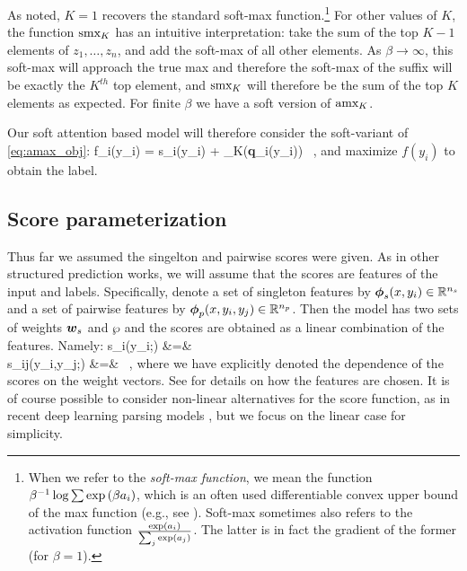 As noted, $K=1$ recovers the standard soft-max function.\footnote{When we refer to the {\em soft-max function}, we mean the function $\beta^{-1}\log\sum \exp\left({\beta a_i}\right)$, which is an often used differentiable convex upper bound of the max function (e.g., see \cite{gimpel2010softmax}). Soft-max sometimes
also refers to the activation function $\frac{\exp\left({a_i}\right)}{\sum_{j} \exp\left({a_j}\right)}$. The latter is in fact the gradient of the former (for $\beta=1$). } For other values of $K$, the function $\text{smx}_K$ has an intuitive interpretation: take the sum of the top $K-1$ elements of $z_1,\ldots,z_n$, and add the soft-max of all other elements. As $\beta \to \infty$, this soft-max will approach the true max and therefore the soft-max of the suffix will be exactly the $K^{th}$ top element, and $\text{smx}_K$ will therefore be the sum of the top $K$ elements as expected. For  finite $\beta$ we have a soft version of $\text{amx}_K$.

Our soft attention based model will therefore consider the soft-variant of \eqref{eq:amax_obj}:
\be
f_i(y_i) = s_i(y_i) + \samax_K({\bf q}_{i}(y_i)) ~,
\label{eq:samax_obj}
\ee
and maximize $f(y_i)$ to obtain the label.
 
\subsection{Score parameterization \label{sec:score_param}}
Thus far we assumed the singelton and pairwise scores were given. As in other structured prediction works, we will assume that the scores are features of the input and labels. Specifically, denote a set of singleton features by $\boldsymbol{\phi}_s(x,y_i)\in\mathbb{R}^{n_s}$ and a set of pairwise features by $\boldsymbol{\phi}_p(x,y_i,y_j)\in\mathbb{R}^{n_p}$. Then the model has two sets of weights $\boldsymbol{w}_s$ and $\wp$ and the scores are obtained as a linear combination of the features. Namely:
\bea
s_i(y_i;\ws) &=& \ws\cdot\fs  \\
s_{ij}(y_i,y_j;\wp) &=& \wp\cdot\fp ~,
\eea
where we have explicitly denoted the dependence of the scores on the weight vectors.  See  for details on how the features are chosen. It is of course possible to consider non-linear alternatives for the score function, as in recent deep learning parsing models \cite{chen2014fast,neurosis}, but we focus on the linear case for simplicity.

